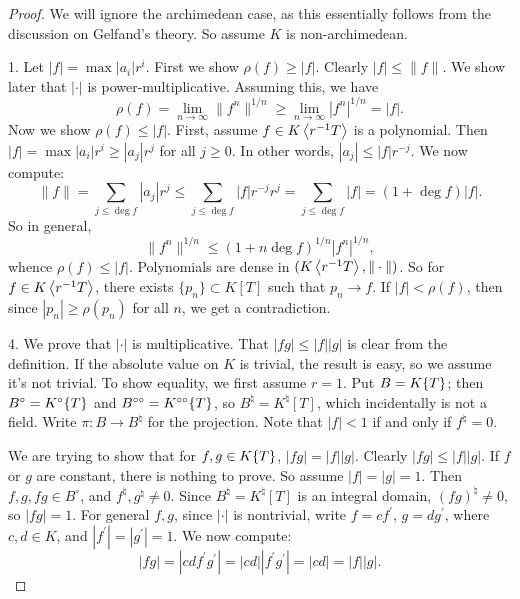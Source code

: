 \begin{proof}
We will ignore the archimedean case, as this essentially follows from the 
discussion on Gelfand's theory. So assume $K$ is non-archimedean.

1. Let $|f|=\max |a_i| r^i$. First we show $\rho(f) \geqslant |f|$. Clearly 
$|f|\leqslant \|f\|$. We show later that $|\cdot|$ is power-multiplicative. 
Assuming this, we have 
\[
  \rho(f) = \lim_{n\to \infty} \|f^n\|^{1/n} \geqslant \lim_{n\to \infty} |f^n|^{1/n} = |f| .
\]
Now we show $\rho(f) \leqslant |f|$. First, assume $f\in K\left\langle r^{-1} T \right\rangle$ is 
a polynomial. Then $|f| = \max |a_i|r^i \geqslant |a_j| r^j$ for all 
$j\geqslant 0$. In other words, $|a_j| \leqslant |f| r^{-j}$. We now compute: 
\[
	\|f\| = \sum_{j\leqslant \deg f} |a_j| r^j \leqslant \sum_{j\leqslant \deg f} |f| r^{-j} r^j = \sum_{j\leqslant \deg f} |f| = (1+\deg f)|f| .
\]
So in general, 
\[
	\|f^n\|^{1/n} \leqslant (1+n\deg f)^{1/n} |f^n|^{1/n} ,
\]
whence $\rho(f) \leqslant |f|$. 
Polynomials are dense in $(K\left\langle r^{-1}T \right\rangle,\|\cdot\|)$. So 
for $f\in K\left\langle r^{-1} T \right\rangle$, there exists $\{p_n\}\subset K[T]$ such that 
$p_n\to f$. If $|f|<\rho(f)$, then since $|p_n|\geqslant \rho(p_n)$ for all 
$n$, we get a contradiction. 

4. We prove that $|\cdot|$ is multiplicative. 
That $|f g| \leqslant |f| |g|$ is clear from the definition. If the absolute 
value on $K$ is trivial, the result is easy, so we assume it's not trivial. To 
show equality, we first assume $r=1$. Put $B=K\{ T \}$; then 
$B^\circ = K^\circ\{ T \}$ and $B^{\circ\circ}=K^{\circ\circ}\{ T \}$, so 
$B^\natural = K^\natural[T]$, which incidentally is not a field. Write 
$\pi\colon B\to B^\natural$ for the projection. Note that $|f|<1$ if and only 
if $f^\natural=0$. 

We are trying to show that for $f,g\in K\{ T \}$, $|fg|=|f||g|$. Clearly 
$|f g|\leqslant |f| |g|$. If $f$ or $g$ are constant, there is nothing to 
prove. So assume $|f|=|g|=1$. Then $f,g,f g\in B^\circ$, and 
$f^\natural,g^\natural\ne 0$. Since $B^\natural=K^\natural[T]$ is an integral 
domain, $(f g)^\natural\ne 0$, so $|f g|=1$. For general $f,g$, since $|\cdot|$ 
is nontrivial, write $f=c f^\prime$, $g=d g^\prime$, where 
$c,d\in K$, and $|f^\prime|=|g^\prime|=1$. We now compute: 
\[
	|f g| = |cdf^\prime g^\prime| = |c d| |f^\prime g^\prime| = |c d| = |f| |g| .
\]


\end{proof}
